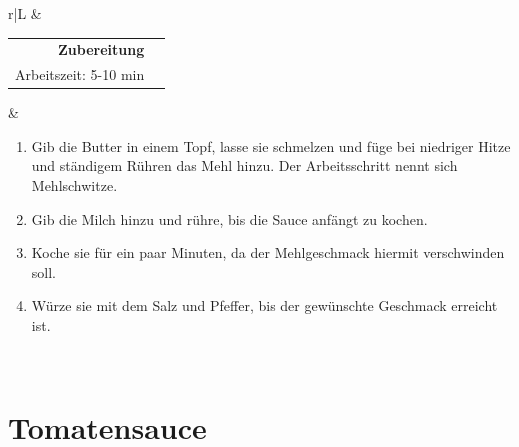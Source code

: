 \documentclass[a4paper, 12pt]{scrbook} 								%
\numberwithin{equation}{section} 									%
\begin{document}
\begin{tabularx}{\textwidth}{r|L}
								&	\\	
		\begin{tabular}[t]{rr}
			\textbf{Zubereitung}	\\
			Arbeitszeit: 5-10 min		\\
		\end{tabular}			&	\begin{enumerate}[]
										\item Gib die Butter in einem Topf, lasse sie schmelzen und füge bei niedriger Hitze und ständigem Rühren das Mehl hinzu. Der Arbeitsschritt nennt sich Mehlschwitze.
										\item Gib die Milch hinzu und rühre, bis die Sauce anfängt zu kochen.
										\item Koche sie für ein paar Minuten, da der Mehlgeschmack hiermit verschwinden soll.
										\item Würze sie mit dem Salz und Pfeffer, bis der gewünschte Geschmack erreicht ist. 
									\end{enumerate}	\\
	\end{tabularx}
	\newpage


	\section{Tomatensauce}	\label{tomatensauce}
\end{document}
